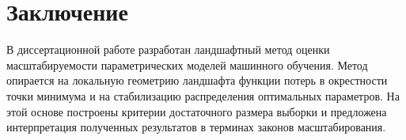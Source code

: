 \chapter*{Заключение}                       %


В диссертационной работе разработан ландшафтный метод оценки масштабируемости параметрических моделей машинного обучения. Метод опирается на локальную геометрию ландшафта функции потерь в окрестности точки минимума и на стабилизацию распределения оптимальных параметров. На этой основе построены критерии достаточного размера выборки и предложена интерпретация полученных результатов в терминах законов масштабирования.

